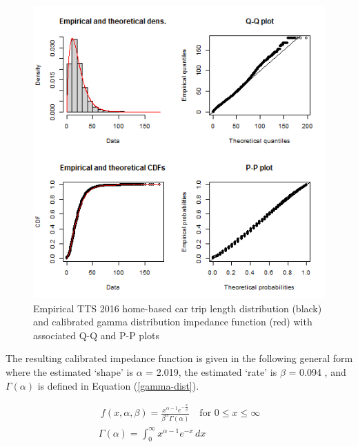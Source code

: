 \documentclass[Royal,times,sageh]{sagej}
\begin{document}
\begin{figure}
\includegraphics[width=1\linewidth]{images/impedance_function} \caption{\label{fig:TLD-Gamma-plot}Empirical TTS 2016 home-based car trip length distribution (black) and calibrated gamma distribution impedance function (red) with associated Q-Q and P-P plots}\label{fig:TLD-Gamma-plot}
\end{figure}

The resulting calibrated impedance function is given in the following
general form where the estimated `shape' is \(\alpha\) = 2.019, the
estimated `rate' is \(\beta\) = 0.094 , and \(\Gamma(\alpha)\) is
defined in Equation (\ref{gamma-dist}).

\begin{equation}
\label{gamma-dist}
\begin{array}{l}\ 
f(x, \alpha, \beta) = \frac {x^{\alpha-1}e^{-\frac{x}{\beta}}}{ \beta^{\alpha}\Gamma(\alpha)} \quad \text{for } 0 \leq x \leq \infty\\
\Gamma(\alpha) =  \int_{0}^{\infty} x^{\alpha-1}e^{-x} \,dx\\
\end{array}
\end{equation}
\end{document}
